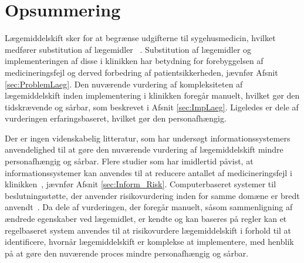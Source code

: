 
\section{Opsummering}
Lægemiddelskift sker for at begrænse udgifterne til sygehusmedicin, hvilket medfører substitution af lægemidler ~\citep{Ess2003, Johnston2011}. Substitution af lægemidler og implementeringen af disse i klinikken har betydning for forebyggelsen af medicineringsfejl og derved forbedring af patientsikkerheden, jævnfør Afsnit \ref{sec:ProblemLaeg}. Den nuværende vurdering af kompleksiteten af lægemiddelskift inden implementering i klinikken foregår manuelt, hvilket gør den tidskrævende og sårbar, som beskrevet i Afsnit \ref{sec:ImpLaeg}. Ligeledes er dele af vurderingen erfaringsbaseret, hvilket gør den personafhængig.

Der er ingen videnskabelig litteratur, som har undersøgt informationssystemers anvendelighed til at gøre den nuværende vurdering af lægemiddelskift mindre personafhængig og sårbar. Flere studier som har imidlertid påvist, at informationssystemer kan anvendes til at reducere antallet af medicineringsfejl i klinikken~\citep{Agrawal2009, Stenner2010, Fischer2008, Simpson2008}, jævnfør Afsnit \ref{sec:Inform_Risk}. Computerbaseret systemer til beslutningsstøtte, der anvender risikovurdering inden for samme domæne er bredt anvendt~\citep{Geissert2018, Rawshani2018}. Da dele af vurderingen, der foregår manuelt, såsom sammenligning af ændrede egenskaber ved lægemidlet, er kendte og kan baseres på regler kan et regelbaseret system anvendes til at risikovurdere lægemiddelskift i forhold til at identificere, hvornår lægemiddelskift er komplekse at implementere, med henblik på at gøre den nuværende proces mindre personafhængig og sårbar. 

